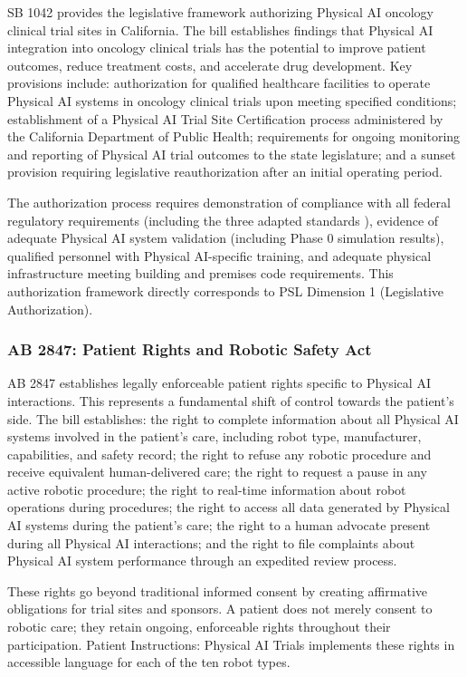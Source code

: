 SB 1042 provides the legislative framework authorizing Physical AI oncology
clinical trial sites in California. The bill establishes findings that Physical
AI integration into oncology clinical trials has the potential to improve
patient outcomes, reduce treatment costs, and accelerate drug development. Key
provisions include: authorization for qualified healthcare facilities to operate
Physical AI systems in oncology clinical trials upon meeting specified
conditions; establishment of a Physical AI Trial Site Certification process
administered by the California Department of Public Health; requirements for
ongoing monitoring and reporting of Physical AI trial outcomes to the state
legislature; and a sunset provision requiring legislative reauthorization after
an initial operating period.

The authorization process requires demonstration of compliance with all federal
regulatory requirements (including the three adapted standards
\cite{ich-adapt, cfr50-adapt, cfr312-adapt}), evidence of adequate Physical AI
system validation (including Phase 0 simulation results), qualified personnel
with Physical AI-specific training, and adequate physical infrastructure meeting
building and premises code requirements. This authorization framework directly
corresponds to PSL Dimension 1 (Legislative Authorization).

\subsubsection{AB 2847: Patient Rights and Robotic Safety Act}

AB 2847 establishes legally enforceable patient rights specific to Physical AI
interactions. This represents a fundamental shift of control towards the
patient's side. The bill establishes: the right to complete information about
all Physical AI systems involved in the patient's care, including robot type,
manufacturer, capabilities, and safety record; the right to refuse any robotic
procedure and receive equivalent human-delivered care; the right to request a
pause in any active robotic procedure; the right to real-time information
about robot operations during procedures; the right to access all data
generated by Physical AI systems during the patient's care; the right to a
human advocate present during all Physical AI interactions; and the right to
file complaints about Physical AI system performance through an expedited
review process.

These rights go beyond traditional informed consent by creating affirmative
obligations for trial sites and sponsors. A patient does not merely consent to
robotic care; they retain ongoing, enforceable rights throughout their
participation. Patient Instructions: Physical AI Trials
\cite{patient-instructions-paper} implements these rights in accessible
language for each of the ten robot types.

